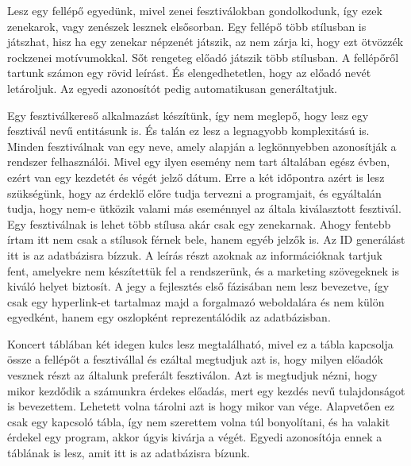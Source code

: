 Lesz egy fellépő egyedünk, mivel zenei fesztiválokban gondolkodunk, így ezek zenekarok, vagy zenészek lesznek elsősorban. Egy fellépő több stílusban is játszhat, hisz ha egy zenekar népzenét játszik, az nem zárja ki, hogy ezt ötvözzék rockzenei motívumokkal. Sőt rengeteg előadó játszik több stílusban. A fellépőről tartunk számon egy rövid leírást. És elengedhetetlen, hogy az előadó nevét letároljuk. Az egyedi azonosítót pedig automatikusan generáltatjuk. 

Egy fesztiválkereső alkalmazást készítünk, így nem meglepő, hogy lesz egy fesztivál nevű entitásunk is. És talán ez lesz a legnagyobb komplexitású is. Minden fesztiválnak van egy neve, amely alapján a legkönnyebben azonosítják a rendszer felhasználói. Mivel egy ilyen esemény nem tart általában egész évben, ezért van egy kezdetét és végét jelző dátum. Erre a két időpontra azért is lesz szükségünk, hogy az érdeklő előre tudja  tervezni a programjait, és egyáltalán tudja, hogy nem-e ütközik valami más eseménnyel az általa kiválasztott fesztivál. Egy fesztiválnak is lehet több stílusa akár csak egy zenekarnak. Ahogy fentebb írtam itt nem csak a stílusok férnek bele, hanem egyéb jelzők is. Az ID generálást itt is az adatbázisra bízzuk. A leírás részt azoknak az információknak tartjuk fent, amelyekre nem készítettük fel a rendszerünk, és a marketing szövegeknek is kiváló helyet biztosít. A jegy a fejlesztés első fázisában nem lesz bevezetve, így csak egy hyperlink-et tartalmaz majd a forgalmazó weboldalára és nem külön egyedként, hanem egy oszlopként reprezentálódik az adatbázisban.

Koncert táblában két idegen kulcs lesz megtalálható, mivel ez a tábla kapcsolja össze a fellépőt a fesztivállal és ezáltal megtudjuk azt is, hogy milyen előadók vesznek részt az általunk preferált fesztiválon. Azt is megtudjuk nézni, hogy mikor kezdődik a számunkra érdekes előadás, mert egy kezdés nevű tulajdonságot is bevezettem. Lehetett volna tárolni azt is hogy mikor van vége. Alapvetően ez csak egy kapcsoló tábla, így nem szerettem volna túl bonyolítani, és ha valakit érdekel egy program, akkor úgyis kivárja a végét. Egyedi azonosítója ennek a táblának is lesz, amit itt is az adatbázisra bízunk.

